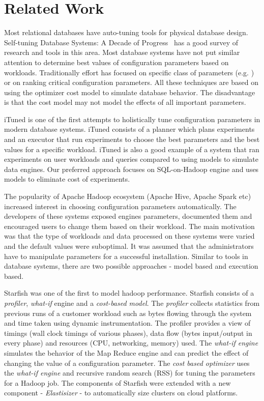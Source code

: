 \section{Related Work}
\label{sec:relatedwork}
Most relational databases have auto-tuning tools for physical database design. 
Self-tuning Database Systems: A Decade of Progress~\cite{Chaudhuri}
 has a good survey of research and tools in this area. Most database systems have 
not put similar attention to determine best values of configuration parameters 
based on workloads. Traditionally effort has focused on specific class of parameters 
(e.g.\cite{Storm} ) or on ranking
critical configuration parameters\cite{DebnathLM08}. All these techniques
are based on using the optimizer cost model to simulate database behavior. The disadvantage is
that the cost model may not model the effects of all important parameters.

iTuned\cite{Duan} is one of the first attempts to holistically 
tune configuration parameters in modern database systems. iTuned consists of a planner
which plans experiments and an executor that run experiments to choose the best parameters
and the best values for a specific workload. iTuned is also a good example of a system that
ran experiments on user workloads and queries compared to using models to simulate data engines.
Our preferred approach focuses on SQL-on-Hadoop engine and uses models to eliminate cost of experiments.
 
The popularity of Apache Hadoop ecosystem (Apache Hive, Apache Spark etc) increased interest
in choosing configuration parameters automatically. The developers of these systems exposed
engines parameters, documented them and encouraged users to change them based on their workload.
The main motivation was that the type of workloads and data processed on these systems were varied
and the default values were suboptimal. It was assumed that the administrators have to manipulate
parameters for a successful installation. Similar to tools in database systems, there are two possible approaches - model based and execution based.

Starfish \cite{herodotou2011starfish} was one of the first to model hadoop performance. Starfish 
consists of a \textit{profiler}, \textit{what-if} engine and a \textit{cost-based model}\cite{herodotou2011profiling}. 
The \textit{profiler} collects statistics from previous runs of a customer workload 
such as bytes flowing through the system and time taken using dynamic instrumentation. The profiler provides a view of timings (wall clock timings of various phases),
data flow (bytes input/output in every phase) and resources (CPU, networking, memory) used. The \textit{what-if engine} simulates 
the behavior of the Map Reduce engine and can predict the effect of changing the value 
of a configuration parameter. The \textit{cost based optimizer} uses the \textit{what-if engine}
and recursive random search (RSS) for tuning the parameters for a Hadoop job. The components of
Starfish were extended with a new component - \textit{Elastisizer}\cite{HerodotouNoOne}
- to automatically size clusters on cloud platforms. 

